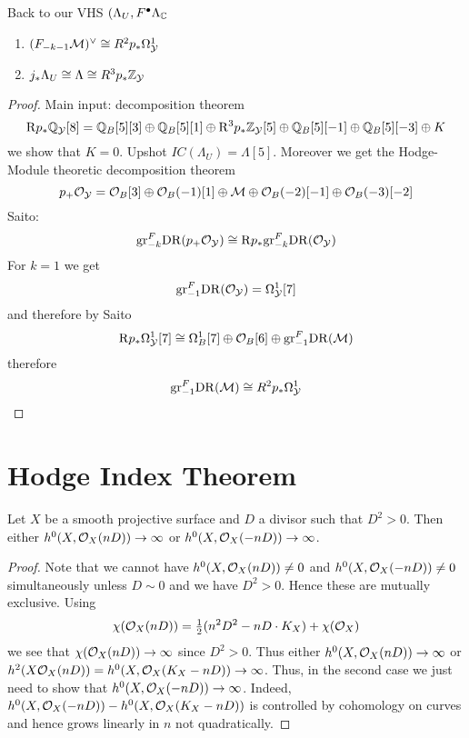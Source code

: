 \documentclass[12pt]{article}
\renewcommand{\gr}{\mathrm{gr}}
\newcommand{\R}{\mathrm{R}}
\begin{document}
\begin{prop}
Back to our VHS $(\Lambda_U, F^\bullet \Lambda_{\mathbb{C}}$ 
\begin{enumerate}
\item $(F_{-k-1} \mathcal{M})^\vee \cong R^2 p_* \Omega_{\mathcal{Y}}^1$
\item $j_* \Lambda_U \cong \Lambda \cong R^3 p_* \mathbb{Z}_{\mathcal{Y}}$
\end{enumerate}
\end{prop}

\newcommand{\DR}{\mathrm{DR}}

\begin{proof}
Main input: decomposition theorem
\[ \R p_* \Q_{\cY}[8] = \Q_B [5][3] \oplus \Q_B[5][1] \oplus \R^3 p_* \Z_{\cY}[5] \oplus \Q_B[5][-1] \oplus \Q_B[5][-3] \oplus K \]
we show that $K = 0$. Upshot $IC(\Lambda_U) = \Lambda[5]$. Moreover we get the Hodge-Module theoretic decomposition theorem
\[ p_+ \mathcal{O}_{\mathcal{Y}} = \mathcal{O}_{B}[3] \oplus \mathcal{O}_{B}(-1) [1] \oplus \mathcal{M} \oplus \mathcal{O}_{B}(-2)[-1] \oplus \mathcal{O}_{B}(-3)[-2] \]
Saito: 
\[ \gr^F_{-k} \DR(p_+ \struct{\cY}) \cong \R p_* \gr^F_{-k} \DR(\struct{\cY}) \]
For $k = 1$ we get
\[ \gr_{-1}^F \DR(\struct{\cY}) = \Omega_{\cY}^1[7] \]
and therefore by Saito
\[ \R p_* \Omega_{\cY}^1[7] \cong \Omega_B^1[7] \oplus \struct{B}[6] \oplus \gr^F_{-1} \DR(\M) \]
therefore
\[ \gr^F_{-1} \DR(\M) \cong R^2 p_* \Omega^1_{\cY} \]
\end{proof}



\section{Hodge Index Theorem}

\begin{lemma}
Let $X$ be a smooth projective surface and $D$ a divisor such that $D^2 > 0$. Then either $h^0(X, \mathcal{O}_{X}(nD)) \to \infty$ or $h^0(X, \mathcal{O}_{X}(-nD)) \to \infty$.
\end{lemma}

\begin{proof}
Note that we cannot have $h^0(X, \mathcal{O}_{X}(nD)) \neq 0$ and $h^0(X, \mathcal{O}_{X}(-nD)) \neq 0$ simultaneously unless $D \sim 0$ and we have $D^2 > 0$. Hence these are mutually exclusive. Using
\[ \chi(\mathcal{O}_{X}(nD)) = \tfrac{1}{2} (n^2 D^2 - n D \cdot K_X) + \chi(\mathcal{O}_{X}) \] 
we see that $\chi(\mathcal{O}_{X}(nD)) \to \infty$ since $D^2 > 0$. Thus either $h^0(X, \mathcal{O}_{X}(nD)) \to \infty$ or $h^2(X \mathcal{O}_{X}(nD)) = h^0(X, \mathcal{O}_{X}(K_X - nD)) \to \infty$. Thus, in the second case we just need to show that $h^0(X, \mathcal{O}_{X}(-nD)) \to \infty$. Indeed, $h^0(X, \mathcal{O}_{X}(-nD)) - h^0(X, \mathcal{O}_{X}(K_X - nD))$ is controlled by cohomology on curves and hence grows linearly in $n$ not quadratically. 
\end{proof}
\end{document}
